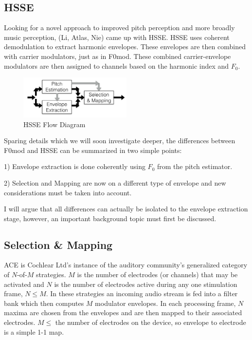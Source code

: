 \documentclass [11pt, proquest] {uwthesis}[2015/03/03]
\begin{document}
\subsection{HSSE}

Looking for a novel approach to improved pitch perception and more broadly music perception, (Li, Atlas, Nie) came up with HSSE.  HSSE uses coherent demodulation to extract harmonic envelopes.  These envelopes are then combined with carrier modulators, just as in F0mod.  These combined carrier-envelope modulators are then assigned to channels based on the harmonic index and $F_0$.

\begin{figure}[!ht]
  \centering
    \includegraphics[width=0.5\textwidth]{HSSE_flow_diagramTEMP}   
    \caption{HSSE Flow Diagram}
\end{figure}

Sparing details which we will soon investigate deeper, the differences between F0mod and HSSE can be summarized in two simple points:

1) Envelope extraction is done coherently using $F_0$ from the pitch estimator.

2) Selection and Mapping are now on a different type of envelope and new considerations must be taken into account.


I will argue that all differences can actually be isolated to the envelope extraction stage, however, an important background topic must first be discussed.


\subsection{Selection \& Mapping}

ACE is Cochlear Ltd's instance of the auditory community's generalized category of $N$-of-$M$ strategies.  $M$ is the number of electrodes (or channels) that may be activated and $N$ is the number of electrodes active during any one stimulation frame, $N \leq M$.  In these strategies an incoming audio stream is fed into a filter bank which then computes $M$ modulator envelopes.  In each processing frame, $N$ maxima are chosen from the envelopes and are then mapped to their associated electrodes.  $M \leq$ the number of electrodes on the device, so envelope to electrode is a simple 1-1 map.
\end{document}
